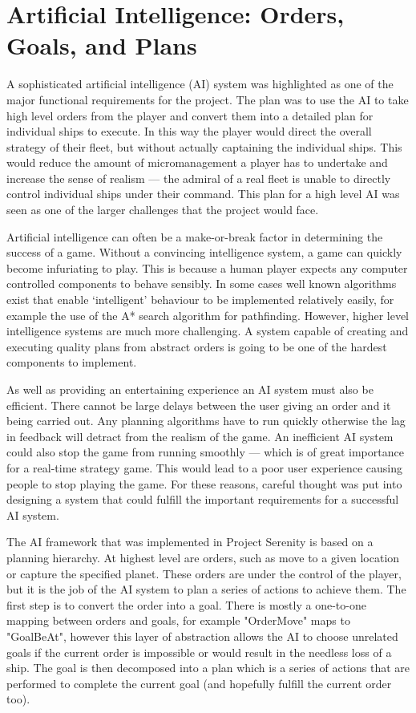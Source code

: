 \section{Artificial Intelligence: Orders, Goals, and Plans}
\label{sec:ai}

A sophisticated artificial intelligence (AI) system was highlighted as one of the major
functional requirements for the project. The plan was to use the AI to take high
level orders from the player and convert them into a detailed plan for individual
ships to execute. In this way the player would direct the overall strategy of their
fleet, but without actually captaining the individual ships. This would reduce the
amount of micromanagement a player has to undertake and increase the sense of realism
--- the admiral of a real fleet is unable to directly control individual ships under
their command. This plan for a high level AI was seen as one of the larger challenges
that the project would face.

Artificial intelligence can often be a make-or-break factor in determining the success of
a game. Without a convincing intelligence system, a game can
quickly become infuriating to play. This is because a human player expects any computer
controlled components to behave sensibly. In some cases well known algorithms exist that
enable `intelligent' behaviour to be implemented relatively easily, for example the use
of the A* search algorithm for pathfinding. However, higher level intelligence systems
are much more challenging. A system capable of creating and executing quality plans
from abstract orders is going to be one of the hardest components to implement.

As well as providing an entertaining experience an AI system must also be efficient.
There cannot be large delays between the user giving an order and it being carried
out. Any planning algorithms have to run quickly otherwise the lag in feedback will
detract from the realism of the game. An inefficient AI system could also stop the game
from running smoothly --- which is of great importance for a real-time strategy game.
This would lead to a poor user experience causing people to stop playing the game.
For these reasons, careful thought was put into designing a system that could fulfill
the important requirements for a successful AI system.

The AI framework that was implemented in Project Serenity is based on a planning
hierarchy. At highest level are orders, such as move to a given location or capture
the specified planet. These orders are under the control of the player, but it is
the job of the AI system to plan a series of actions to achieve them. The first step
is to convert the order into a goal. There is mostly a one-to-one mapping between
orders and goals, for example "OrderMove" maps to "GoalBeAt", however this layer of
abstraction allows the AI to choose unrelated goals if the current order is impossible
or would result in the needless loss of a ship. The goal is then decomposed into a
plan which is a series of actions that are performed to complete the current goal
(and hopefully fulfill the current order too).


